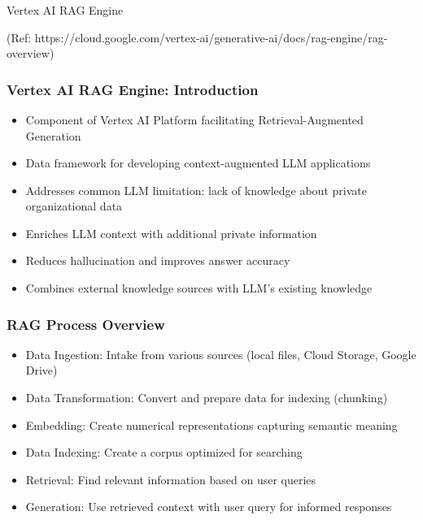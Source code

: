 \begin{frame}[fragile]\frametitle{}
\begin{center}
{\Large Vertex AI RAG Engine}

{\tiny (Ref: https://cloud.google.com/vertex-ai/generative-ai/docs/rag-engine/rag-overview)}
\end{center}
\end{frame}

\begin{frame}[fragile]\frametitle{Vertex AI RAG Engine: Introduction}
      \begin{itemize}
        \item Component of Vertex AI Platform facilitating Retrieval-Augmented Generation
        \item Data framework for developing context-augmented LLM applications
        \item Addresses common LLM limitation: lack of knowledge about private organizational data
        \item Enriches LLM context with additional private information
        \item Reduces hallucination and improves answer accuracy
        \item Combines external knowledge sources with LLM's existing knowledge
      \end{itemize}
\end{frame}

\begin{frame}[fragile]\frametitle{RAG Process Overview}
      \begin{itemize}
        \item Data Ingestion: Intake from various sources (local files, Cloud Storage, Google Drive)
        \item Data Transformation: Convert and prepare data for indexing (chunking)
        \item Embedding: Create numerical representations capturing semantic meaning
        \item Data Indexing: Create a corpus optimized for searching
        \item Retrieval: Find relevant information based on user queries
        \item Generation: Use retrieved context with user query for informed responses
      \end{itemize}
\end{frame}

